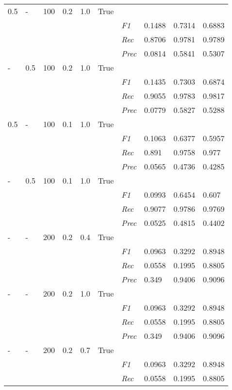 \begin{table}[H]
\begin{tabularx}{\textwidth}{XXXXXX|X|X|X|X}
    0.5 & - & 100 & 0.2 & 1.0 &True & & & & \\
    & & & & & & \textit{F1} & 0.1488 & 0.7314   & 0.6883     \\
    & & & & & & \textit{Rec} &  0.8706 & 0.9781 & 0.9789   \\
    & & & & & & \textit{Prec} & 0.0814 & 0.5841 & 0.5307 \\ \midrule
    - & 0.5 & 100 & 0.2 & 1.0 &True & & & & \\
    & & & & & & \textit{F1} & 0.1435 & 0.7303   & 0.6874     \\
    & & & & & & \textit{Rec} &  0.9055 & 0.9783 & 0.9817   \\
    & & & & & & \textit{Prec} & 0.0779 & 0.5827 & 0.5288 \\ \midrule
    0.5 & - & 100 & 0.1 & 1.0 &True & & & & \\
    & & & & & & \textit{F1} & 0.1063 & 0.6377   & 0.5957     \\
    & & & & & & \textit{Rec} &  0.891 & 0.9758 & 0.977   \\
    & & & & & & \textit{Prec} & 0.0565 & 0.4736 & 0.4285 \\ \midrule
    - & 0.5 & 100 & 0.1 & 1.0 &True & & & & \\
    & & & & & & \textit{F1} & 0.0993 & 0.6454   & 0.607     \\
    & & & & & & \textit{Rec} &  0.9077 & 0.9786 & 0.9769   \\
    & & & & & & \textit{Prec} & 0.0525 & 0.4815 & 0.4402 \\ \midrule
    - & - & 200 & 0.2 & 0.4 &True & & & & \\
    & & & & & & \textit{F1} & 0.0963 & 0.3292   & 0.8948     \\
    & & & & & & \textit{Rec} &  0.0558 & 0.1995 & 0.8805   \\
    & & & & & & \textit{Prec} & 0.349 & 0.9406 & 0.9096 \\ \midrule
    - & - & 200 & 0.2 & 1.0 &True & & & & \\
    & & & & & & \textit{F1} & 0.0963 & 0.3292   & 0.8948     \\
    & & & & & & \textit{Rec} &  0.0558 & 0.1995 & 0.8805   \\
    & & & & & & \textit{Prec} & 0.349 & 0.9406 & 0.9096 \\ \midrule
    - & - & 200 & 0.2 & 0.7 &True & & & & \\
    & & & & & & \textit{F1} & 0.0963 & 0.3292   & 0.8948     \\
    & & & & & & \textit{Rec} &  0.0558 & 0.1995 & 0.8805   \\

\end{tabularx}
\end{table}
